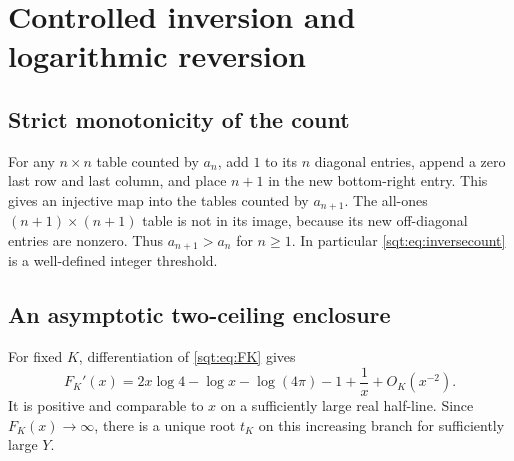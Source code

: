 \section{Controlled inversion and logarithmic reversion}\label{sqt:sec:inverse}
\subsection{Strict monotonicity of the count}
For any $n\times n$ table counted by $a_n$, add $1$ to its $n$ diagonal entries, append a zero last row and last column, and place $n+1$ in the new bottom-right entry. This gives an injective map into the tables counted by $a_{n+1}$. The all-ones $(n+1)\times(n+1)$ table is not in its image, because its new off-diagonal entries are nonzero. Thus $a_{n+1}>a_n$ for $n\geq1$. In particular \eqref{sqt:eq:inversecount} is a well-defined integer threshold.

\subsection{An asymptotic two-ceiling enclosure}
For fixed $K$, differentiation of \eqref{sqt:eq:FK} gives
\begin{equation}\label{sqt:eq:FKprime}
F_K'(x)=2x\log4-\log x-\log(4\pi)-1+\frac1x+O_K(x^{-2}).
\end{equation}
It is positive and comparable to $x$ on a sufficiently large real half-line. Since $F_K(x)\to\infty$, there is a unique root $t_K$ on this increasing branch for sufficiently large $Y$.

